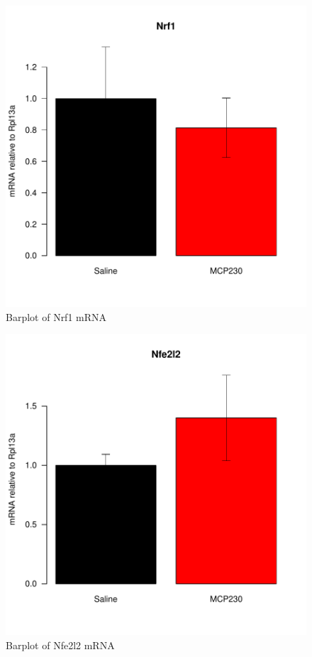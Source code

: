 \documentclass{article}
\begin{document}
\begin{figure}
\begin{center}
\includegraphics{MaternalParticulateMitoBiogen-barplotNrf1}
\end{center}
\caption{Barplot of Nrf1 mRNA}
\label{fig:barplotNrf1}
\end{figure}

\begin{figure}
\begin{center}
\includegraphics{MaternalParticulateMitoBiogen-barplotNfe2l2}
\end{center}
\caption{Barplot of Nfe2l2 mRNA}
\label{fig:barplotNfe2l2}
\end{figure}
\end{document}
